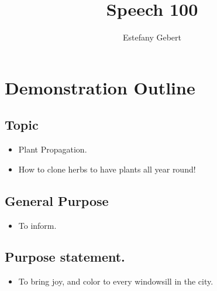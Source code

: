 \documentclass[]{article}
\title{Speech 100}
\author{Estefany Gebert}
\begin{document}
\maketitle 


\section{Demonstration Outline}
\subsection{Topic}
\begin{itemize}
	\item Plant Propagation.
	\item How to clone herbs to have plants all year round!
\end{itemize}
\subsection{General Purpose}
\begin{itemize}
	\item To inform.
\end{itemize}
\subsection{Purpose statement.} 
\begin{itemize}
	\item To bring joy, and color to every windowsill in the city.
\end{itemize}
\end{document}
